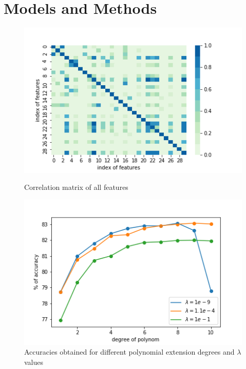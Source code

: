 \documentclass[10pt,conference,compsocconf]{IEEEtran}
\begin{document}
\section{Models and Methods}
\label{sec:methods}


\begin{figure}[h]
	\centering
	\begin{minipage}[b]{0.48\linewidth}
		\includegraphics[width=\textwidth]{correlation.png}
		\captionsetup{aboveskip=0.4cm,justification=centering, margin=0.1cm, labelfont=footnotesize, textfont=footnotesize}
		\caption{Correlation matrix of all features}
		\label{fig:correlation}
	\end{minipage}
	\hspace{0.05cm}
	\begin{minipage}[b]{0.48\linewidth}
		\includegraphics[width=\textwidth]{grid_search.png}
		\captionsetup{aboveskip=0.1cm,justification=centering, margin=0.1cm, labelfont=footnotesize, textfont=footnotesize}
		\caption{Accuracies obtained for different polynomial extension degrees and $\lambda$ values}
		\label{fig:grid_search}
	\end{minipage}
\end{figure}
\end{document}
